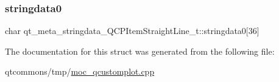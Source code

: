 \subsubsection{\texorpdfstring{stringdata0}{stringdata0}}
{\footnotesize\ttfamily char qt\+\_\+meta\+\_\+stringdata\+\_\+\+Q\+C\+P\+Item\+Straight\+Line\+\_\+t\+::stringdata0\mbox{[}36\mbox{]}}



The documentation for this struct was generated from the following file\+:\begin{DoxyCompactItemize}
\item 
qtcommons/tmp/\mbox{\hyperlink{moc__qcustomplot_8cpp}{moc\+\_\+qcustomplot.\+cpp}}\end{DoxyCompactItemize}
